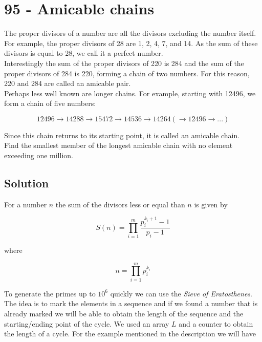 \chapter*{95 - Amicable chains}

The proper divisors of a number are all the divisors excluding the number itself. For example, the proper divisors of 28 are 1, 2, 4, 7, and 14. As the sum of these divisors is equal to 28, we call it a perfect number.\\

Interestingly the sum of the proper divisors of 220 is 284 and the sum of the proper divisors of 284 is 220, forming a chain of two numbers. For this reason, 220 and 284 are called an amicable pair.\\

Perhaps less well known are longer chains. For example, starting with 12496, we form a chain of five numbers:

$$
12496 \rightarrow 14288 \rightarrow 15472 \rightarrow  14536 \rightarrow  14264  (\rightarrow  12496 \rightarrow  ...)
$$

Since this chain returns to its starting point, it is called an amicable chain.\\

Find the smallest member of the longest amicable chain with no element exceeding one million.

\section*{Solution}

For a number $n$ the sum of the divisors less or equal than $n$ is given by

$$
S(n) = \prod_{i=1}^m \frac{p_i^{k_i+1} - 1}{p_i - 1}
$$

where 

$$
n = \prod_{i=1}^m p_i^{k_i}
$$

To generate the primes up to $10^6$ quickly we can use the \textit{Sieve of Eratosthenes}.\\

The idea is to mark the elements in a sequence and if we found a number that is already marked we will be able to obtain the length of the sequence and the starting/ending point of the cycle. We used an array $L$ and a counter to obtain the length of a cycle. For the example mentioned in the description we will have

